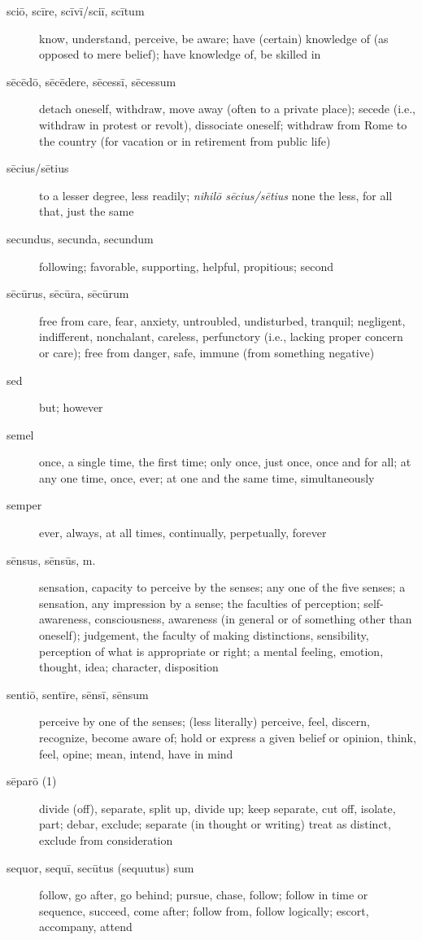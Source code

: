 \begin{description}
    \item[sciō, scīre, scīvī/sciī, scītum] know, understand, perceive, be aware; have (certain) knowledge of (as opposed to mere belief);  have knowledge of, be skilled in
    \item[sēcēdō, sēcēdere, sēcessī, sēcessum] detach oneself, withdraw, move away (often to a private place); secede (i.e., withdraw in protest or revolt), dissociate oneself; withdraw from Rome to the country (for vacation or in retirement from public life)
    \item[sēcius/sētius] to a lesser degree, less readily; \textit{nihilō sēcius/sētius} none the less, for all that, just the same
    \item[secundus, secunda, secundum] following; favorable, supporting, helpful, propitious; second
    \item[sēcūrus, sēcūra, sēcūrum] free from care, fear, anxiety, untroubled, undisturbed, tranquil; negligent, indifferent, nonchalant, careless, perfunctory (i.e., lacking proper concern or care); free from danger, safe, immune (from something negative)
    \item[sed] but; however
    \item[semel] once, a single time, the first time; only once, just once, once and for all; at any one time, once, ever; at one and the same time, simultaneously
    \item[semper] ever, always, at all times, continually, perpetually, forever
    \item[sēnsus, sēnsūs, m.] sensation, capacity to perceive by the senses; any one of the five senses; a sensation, any impression by a sense; the faculties of perception; self-awareness, consciousness, awareness (in general or of something other than oneself); judgement, the faculty of making distinctions, sensibility, perception of what is appropriate or right; a mental feeling, emotion, thought, idea; character, disposition
    \item[sentiō, sentīre, sēnsī, sēnsum] perceive by one of the senses; (less literally) perceive, feel, discern, recognize, become aware of; hold or express a given belief or opinion, think, feel, opine; mean, intend, have in mind
    \item[sēparō (1)] divide (off), separate, split up, divide up; keep separate, cut off, isolate, part; debar, exclude; separate (in thought or writing) treat as distinct, exclude from consideration
    \item[sequor, sequī, secūtus (sequutus) sum] follow, go after, go behind; pursue, chase, follow; follow in time or sequence, succeed, come after; follow from, follow logically; escort, accompany, attend

\end{description}
